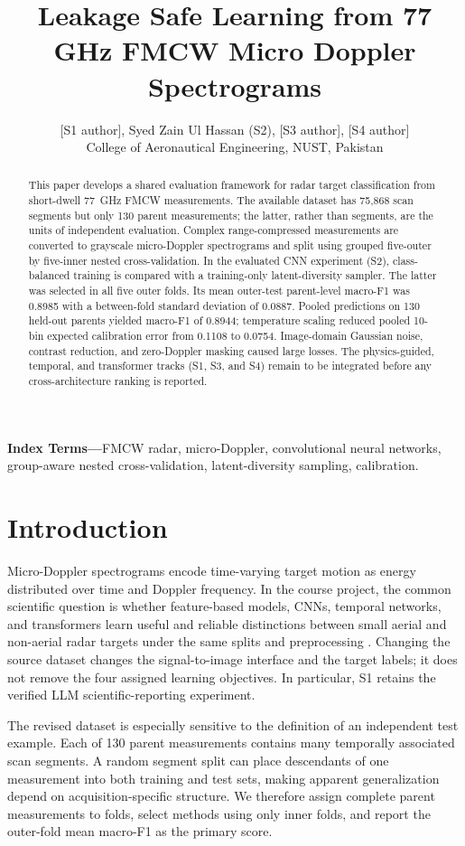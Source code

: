 \IfFileExists{IEEEtran.cls}{\ieeetrue\documentclass[conference]{IEEEtran}}{\ieeefalse\documentclass[10pt,twocolumn,letterpaper]{article}}
\title{Leakage Safe Learning from 77 GHz FMCW Micro Doppler Spectrograms}
\author{
\IEEEauthorblockN{[S1 author], Syed Zain Ul Hassan (S2), [S3 author], [S4 author]}
\IEEEauthorblockA{College of Aeronautical Engineering, National University of Sciences and Technology, Pakistan\\
[Affiliations and contact emails to be confirmed by the team]}
}
\author{[S1 author], Syed Zain Ul Hassan (S2), [S3 author], [S4 author]\\
\small College of Aeronautical Engineering, NUST, Pakistan}
\date{}
\begin{document}
\maketitle

\begin{abstract}
This paper develops a shared evaluation framework for radar target classification from short-dwell 77~GHz FMCW measurements. The available dataset has 75,868 scan segments but only 130 parent measurements; the latter, rather than segments, are the units of independent evaluation. Complex range-compressed measurements are converted to grayscale micro-Doppler spectrograms and split using grouped five-outer by five-inner nested cross-validation. In the evaluated CNN experiment (S2), class-balanced training is compared with a training-only latent-diversity sampler. The latter was selected in all five outer folds. Its mean outer-test parent-level macro-F1 was 0.8985 with a between-fold standard deviation of 0.0887. Pooled predictions on 130 held-out parents yielded macro-F1 of 0.8944; temperature scaling reduced pooled 10-bin expected calibration error from 0.1108 to 0.0754. Image-domain Gaussian noise, contrast reduction, and zero-Doppler masking caused large losses. The physics-guided, temporal, and transformer tracks (S1, S3, and S4) remain to be integrated before any cross-architecture ranking is reported.
\end{abstract}

\noindent\textbf{Index Terms---}FMCW radar, micro-Doppler, convolutional neural networks, group-aware nested cross-validation, latent-diversity sampling, calibration.

\section{Introduction}
Micro-Doppler spectrograms encode time-varying target motion as energy distributed over time and Doppler frequency. In the course project, the common scientific question is whether feature-based models, CNNs, temporal networks, and transformers learn useful and reliable distinctions between small aerial and non-aerial radar targets under the same splits and preprocessing \cite{courseprotocol}. Changing the source dataset changes the signal-to-image interface and the target labels; it does not remove the four assigned learning objectives. In particular, S1 retains the verified LLM scientific-reporting experiment.

The revised dataset is especially sensitive to the definition of an independent test example. Each of 130 parent measurements contains many temporally associated scan segments. A random segment split can place descendants of one measurement into both training and test sets, making apparent generalization depend on acquisition-specific structure. We therefore assign complete parent measurements to folds, select methods using only inner folds, and report the outer-fold mean macro-F1 as the primary score.
\end{document}
